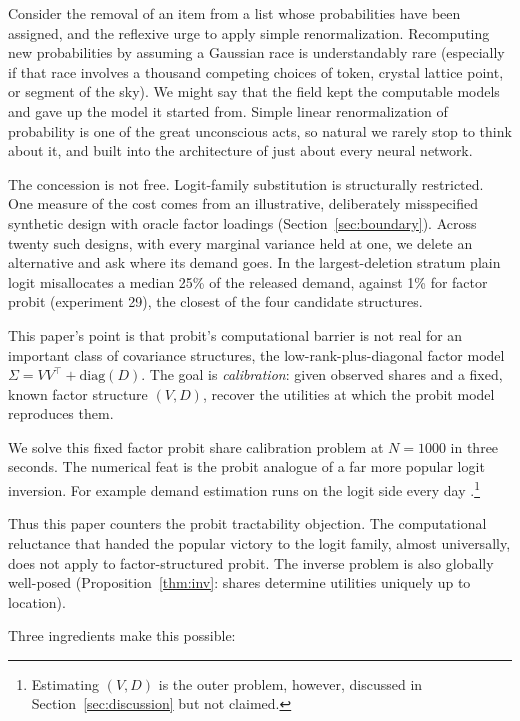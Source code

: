 \documentclass[12pt]{article}
\theoremstyle{remark}
\begin{document}
Consider the removal of an item from a list whose probabilities have been assigned, and the reflexive urge to apply simple renormalization. Recomputing new
probabilities by assuming a Gaussian race is understandably rare (especially if that race involves a thousand competing choices of token, crystal lattice point, or
segment of the sky). We might say that the field kept the computable models and gave up the model it started
from. Simple linear renormalization of probability is one of the great unconscious acts, so natural we rarely stop to think about it, and built into 
the architecture of just about every neural network. 

The concession is not free. Logit-family substitution is structurally
restricted. One measure of the cost comes from an illustrative, deliberately misspecified
synthetic design with oracle factor loadings
(Section~\ref{sec:boundary}). Across twenty such designs, with every
marginal variance held at one, we delete an alternative and ask where
its demand goes. In the largest-deletion stratum plain logit
misallocates a median 25\% of the released demand, against 1\% for
factor probit (experiment 29), the closest of the four candidate
structures.

This paper's point is that probit's computational barrier is not real for an important
class of covariance structures, the low-rank-plus-diagonal factor model
$\Sigma = VV^\top + \mathrm{diag}(D)$. The goal is \emph{calibration}: given
observed shares and a fixed, known factor structure $(V, D)$, recover the
utilities at which the probit model reproduces them. 

We solve this fixed factor probit share calibration problem at $N = 1000$
in three seconds. The numerical feat is the probit analogue of a far more popular logit inversion. For example 
demand estimation runs on the logit side every day \citep{berry1995,conlon2020}.\footnote{Estimating $(V, D)$ is the outer problem, however, 
discussed in Section~\ref{sec:discussion} but not claimed. } 

Thus this paper counters the probit tractability objection. The computational reluctance that handed
the popular victory to the logit family, almost universally, 
does not apply to factor-structured probit. The inverse
problem is also globally well-posed
(Proposition~\ref{thm:inv}: shares determine utilities uniquely up to
location). 

Three ingredients make this possible: 
\end{document}
